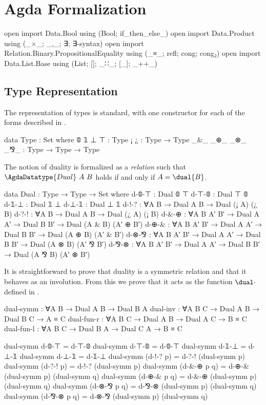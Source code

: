 \section{Agda Formalization}
\label{sec:formalization}

\begin{code}[hide]
open import Data.Bool using (Bool; if_then_else_)
open import Data.Product using (_×_; _,_; ∃; ∃-syntax)
open import Relation.Binary.PropositionalEquality using (_≡_; refl; cong; cong₂)
open import Data.List.Base using (List; []; _∷_; [_]; _++_)
\end{code}

\subsection{Type Representation}
\label{sec:type-agda}

The representation of types is standard, with one constructor for each of the
forms described in .

\begin{code}
data Type : Set where
  𝟘 𝟙 ⊥ ⊤          : Type
  ¡ ¿              : Type → Type
  _&_ _⊕_ _⊗_ _⅋_  : Type → Type → Type
\end{code}

The notion of duality is formalized as a \emph{relation} 
such that $\AgdaDatatype{Dual}~A~B$ holds if and only if $A = \dual{B}$.

\begin{code}
data Dual : Type → Type → Set where
  d-𝟘-⊤  : Dual 𝟘 ⊤
  d-⊤-𝟘  : Dual ⊤ 𝟘
  d-𝟙-⊥  : Dual 𝟙 ⊥
  d-⊥-𝟙  : Dual ⊥ 𝟙
  d-!-?  : ∀{A B} → Dual A B → Dual (¡ A) (¿ B)
  d-?-!  : ∀{A B} → Dual A B → Dual (¿ A) (¡ B)
  d-&-⊕  : ∀{A B A′ B′} → Dual A A′ → Dual B B′ → Dual (A & B) (A′ ⊕ B′)
  d-⊕-&  : ∀{A B A′ B′} → Dual A A′ → Dual B B′ → Dual (A ⊕ B) (A′ & B′)
  d-⊗-⅋  : ∀{A B A′ B′} → Dual A A′ → Dual B B′ → Dual (A ⊗ B) (A′ ⅋ B′)
  d-⅋-⊗  : ∀{A B A′ B′} → Dual A A′ → Dual B B′ → Dual (A ⅋ B) (A′ ⊗ B′)
\end{code}

It is straightforward to prove that duality is a symmetric relation and that it
behaves as an involution. From this we prove that it acts as the function
$\dual\cdot$ defined in .

\begin{code}
dual-symm   : ∀{A B} → Dual A B → Dual B A
dual-inv    : ∀{A B C} → Dual A B → Dual B C → A ≡ C
dual-fun-r  : ∀{A B C} → Dual A B → Dual A C → B ≡ C
dual-fun-l  : ∀{A B C} → Dual B A → Dual C A → B ≡ C
\end{code}
\begin{code}[hide]
dual-symm d-𝟘-⊤ = d-⊤-𝟘
dual-symm d-⊤-𝟘 = d-𝟘-⊤
dual-symm d-𝟙-⊥ = d-⊥-𝟙
dual-symm d-⊥-𝟙 = d-𝟙-⊥
dual-symm (d-!-? p) = d-?-! (dual-symm p)
dual-symm (d-?-! p) = d-!-? (dual-symm p)
dual-symm (d-&-⊕ p q) = d-⊕-& (dual-symm p) (dual-symm q)
dual-symm (d-⊕-& p q) = d-&-⊕ (dual-symm p) (dual-symm q)
dual-symm (d-⊗-⅋ p q) = d-⅋-⊗ (dual-symm p) (dual-symm q)
dual-symm (d-⅋-⊗ p q) = d-⊗-⅋ (dual-symm p) (dual-symm q)
\end{code}

